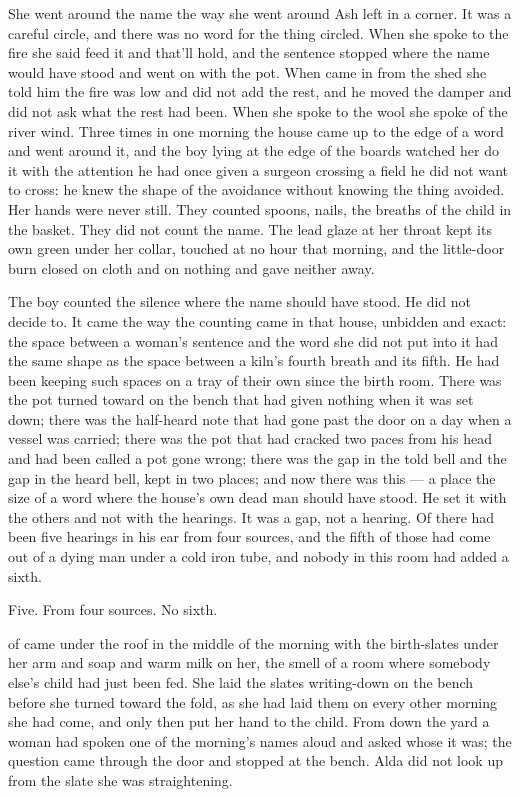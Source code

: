She went around the name the way she went around Ash left in a corner. It was a careful circle, and there was no word for the thing circled. When she spoke to the fire she said feed it and that'll hold, and the sentence stopped where the name would have stood and went on with the pot. When  came in from the shed she told him the fire was low and did not add the rest, and he moved the damper and did not ask what the rest had been. When she spoke to the wool she spoke of the river wind. Three times in one morning the house came up to the edge of a word and went around it, and the boy lying at the edge of the boards watched her do it with the attention he had once given a surgeon crossing a field he did not want to cross: he knew the shape of the avoidance without knowing the thing avoided. Her hands were never still. They counted spoons, nails, the breaths of the child in the basket. They did not count the name. The lead glaze at her throat kept its own green under her collar, touched at no hour that morning, and the little-door burn closed on cloth and on nothing and gave neither away.

The boy counted the silence where the name should have stood. He did not decide to. It came the way the counting came in that house, unbidden and exact: the space between a woman's sentence and the word she did not put into it had the same shape as the space between a kiln's fourth breath and its fifth. He had been keeping such spaces on a tray of their own since the birth room. There was the pot turned toward on the bench that had given nothing when it was set down; there was the half-heard note that had gone past the door on a day when a vessel was carried; there was the pot that had cracked two paces from his head and had been called a pot gone wrong; there was the gap in the told bell and the gap in the heard bell, kept in two places; and now there was this --- a place the size of a word where the house's own dead man should have stood. He set it with the others and not with the hearings. It was a gap, not a hearing. Of  there had been five hearings in his ear from four sources, and the fifth of those had come out of a dying man under a cold iron tube, and nobody in this room had added a sixth.

Five. From four sources. No sixth.

\scenebreak

 of  came under the roof in the middle of the morning with the birth-slates under her arm and soap and warm milk on her, the smell of a room where somebody else's child had just been fed. She laid the slates writing-down on the bench before she turned toward the fold, as she had laid them on every other morning she had come, and only then put her hand to the child. From  down the yard a woman had spoken one of the morning's names aloud and asked whose it was; the question came through the door and stopped at the bench. Alda did not look up from the slate she was straightening.

